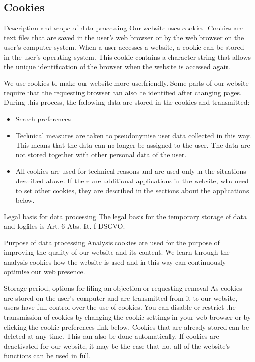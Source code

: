 \documentclass[letterpaper,10pt,english]{sphinxmanual}
\begin{document}
\subsection{Cookies}
\label{\detokenize{policies/cookies:id1}}
\sphinxAtStartPar
Description and scope of data processing
Our website uses cookies. Cookies are text files that are saved in the user’s web browser or by the web browser on the user’s computer system. When a user accesses a website, a cookie can be stored in the user’s operating system. This cookie contains a character string that allows the unique identification of the browser when the website is accessed again.

\sphinxAtStartPar
We use cookies to make our website more user\sphinxhyphen{}friendly. Some parts of our website require that the requesting browser can also be identified after changing pages.
During this process, the following data are stored in the cookies and transmitted:
\begin{itemize}
\item {} 
\sphinxAtStartPar
Search preferences

\item {} 
\sphinxAtStartPar
Technical measures are taken to pseudonymise user data collected in this way. This means that the data can no longer be assigned to the user. The data are not stored together with other personal data of the user.

\item {} 
\sphinxAtStartPar
All cookies are used for technical reasons and are used only in the situations described above. If there are additional applications in the website, who need to set other cookies, they are described in the sections about the applications below.

\end{itemize}

\sphinxAtStartPar
Legal basis for data processing
The legal basis for the temporary storage of data and logfiles is Art. 6 Abs. lit. f DSGVO.

\sphinxAtStartPar
Purpose of data processing
Analysis cookies are used for the purpose of improving the quality of our website and its content. We learn through the analysis cookies how the website is used and in this way can continuously optimise our web presence.

\sphinxAtStartPar
Storage period, options for filing an objection or requesting removal
As cookies are stored on the user’s computer and are transmitted from it to our website, users have full control over the use of cookies. You can disable or restrict the transmission of cookies by changing the cookie settings in your web browser or by clicking the cookie preferences link below. Cookies that are already stored can be deleted at any time. This can also be done automatically. If cookies are deactivated for our website, it may be the case that not all of the website’s functions can be used in full.
\end{document}
